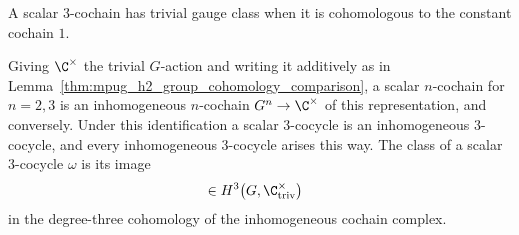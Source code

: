 \begin{definition}
    \label{def:mpug_trivial_gauge_class}
    \leanok
    A scalar $3$-cochain has trivial gauge class when it is cohomologous to
    the constant cochain $1$.
\end{definition}

\begin{definition}
    \label{def:mpug_h3_group_cohomology}
    \leanok
    Giving $\C^\times$ the trivial $G$-action and writing it additively as in
    Lemma~\ref{thm:mpug_h2_group_cohomology_comparison}, a scalar
    $n$-cochain for $n=2,3$ is an inhomogeneous $n$-cochain
    $G^n\to\C^\times$ of this representation, and conversely. Under this
    identification a scalar $3$-cocycle is an inhomogeneous $3$-cocycle, and
    every inhomogeneous $3$-cocycle arises this way. The class of a scalar
    $3$-cocycle $\omega$ is its image
    \begin{align}
        [\omega] & \in H^3\bigl(G,\C^\times_{\mathrm{triv}}\bigr)
        \label{eq:mpug_h3_class}
    \end{align}
    in the degree-three cohomology of the inhomogeneous cochain complex.
\end{definition}

